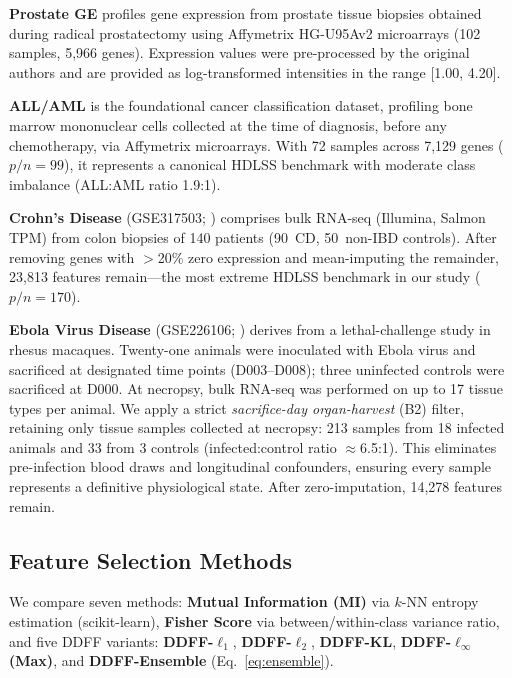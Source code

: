 \documentclass[conference]{IEEEtran}
\begin{document}
\textbf{Prostate GE} \cite{Singh2002ProstateGE} profiles gene expression from prostate tissue biopsies obtained during radical prostatectomy using Affymetrix HG-U95Av2 microarrays (102 samples, 5,966 genes). Expression values were pre-processed by the original authors and are provided as log-transformed intensities in the range [1.00, 4.20].

\textbf{ALL/AML} \cite{Golub1999ALLAML} is the foundational cancer classification dataset, profiling bone marrow mononuclear cells collected at the time of diagnosis, before any chemotherapy, via Affymetrix microarrays. With 72 samples across 7,129 genes ($p/n = 99$), it represents a canonical HDLSS benchmark with moderate class imbalance (ALL:AML ratio 1.9:1).

\textbf{Crohn's Disease} (GSE317503; \cite{Furey2024Crohns}) comprises bulk RNA-seq (Illumina, Salmon TPM) from colon biopsies of 140 patients (90~CD, 50~non-IBD controls). After removing genes with $>$20\% zero expression and mean-imputing the remainder, 23,813 features remain---the most extreme HDLSS benchmark in our study ($p/n = 170$).

\textbf{Ebola Virus Disease} (GSE226106; \cite{Normandin2024Ebola}) derives from a lethal-challenge study in rhesus macaques. Twenty-one animals were inoculated with Ebola virus and sacrificed at designated time points (D003--D008); three uninfected controls were sacrificed at D000. At necropsy, bulk RNA-seq was performed on up to 17 tissue types per animal. We apply a strict \emph{sacrifice-day organ-harvest} (B2) filter, retaining only tissue samples collected at necropsy: 213 samples from 18 infected animals and 33 from 3 controls (infected:control ratio $\approx$6.5:1). This eliminates pre-infection blood draws and longitudinal confounders, ensuring every sample represents a definitive physiological state. After zero-imputation, 14,278 features remain.

\subsection{Feature Selection Methods}

We compare seven methods: \textbf{Mutual Information (MI)} via $k$-NN entropy estimation (scikit-learn), \textbf{Fisher Score} via between/within-class variance ratio, and five DDFF variants: \textbf{DDFF-$\ell_1$}, \textbf{DDFF-$\ell_2$}, \textbf{DDFF-KL}, \textbf{DDFF-$\ell_\infty$ (Max)}, and \textbf{DDFF-Ensemble} (Eq.~\ref{eq:ensemble}).
\end{document}
